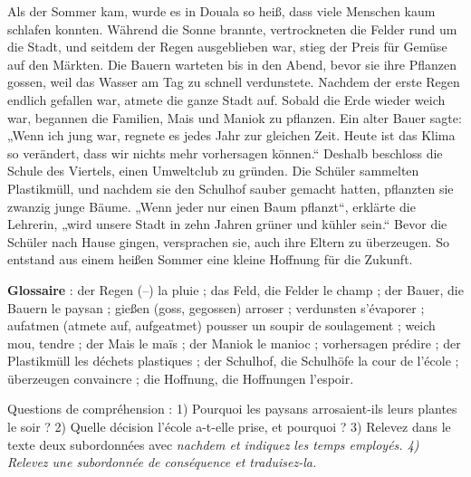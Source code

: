 \documentclass[11pt]{article}
\newcommand{\all}[1]{\ifmmode\text{\textit{#1}}\else\begingroup\selectlanguage{ngerman}\itshape #1\endgroup\fi}
\begin{document}
\begin{textebox}
Als der Sommer kam, wurde es in Douala so heiß, dass viele Menschen kaum schlafen konnten. Während die Sonne brannte, vertrockneten die Felder rund um die Stadt, und seitdem der Regen ausgeblieben war, stieg der Preis für Gemüse auf den Märkten. Die Bauern warteten bis in den Abend, bevor sie ihre Pflanzen gossen, weil das Wasser am Tag zu schnell verdunstete. Nachdem der erste Regen endlich gefallen war, atmete die ganze Stadt auf. Sobald die Erde wieder weich war, begannen die Familien, Mais und Maniok zu pflanzen. Ein alter Bauer sagte: „Wenn ich jung war, regnete es jedes Jahr zur gleichen Zeit. Heute ist das Klima so verändert, dass wir nichts mehr vorhersagen können.“ Deshalb beschloss die Schule des Viertels, einen Umweltclub zu gründen. Die Schüler sammelten Plastikmüll, und nachdem sie den Schulhof sauber gemacht hatten, pflanzten sie zwanzig junge Bäume. „Wenn jeder nur einen Baum pflanzt“, erklärte die Lehrerin, „wird unsere Stadt in zehn Jahren grüner und kühler sein.“ Bevor die Schüler nach Hause gingen, versprachen sie, auch ihre Eltern zu überzeugen. So entstand aus einem heißen Sommer eine kleine Hoffnung für die Zukunft.

\textbf{Glossaire} : der Regen (--) la pluie ; das Feld, die Felder le champ ; der Bauer, die Bauern le paysan ; gießen (goss, gegossen) arroser ; verdunsten s'évaporer ; aufatmen (atmete auf, aufgeatmet) pousser un soupir de soulagement ; weich mou, tendre ; der Mais le maïs ; der Maniok le manioc ; vorhersagen prédire ; der Plastikmüll les déchets plastiques ; der Schulhof, die Schulhöfe la cour de l'école ; überzeugen convaincre ; die Hoffnung, die Hoffnungen l'espoir.
\end{textebox}

Questions de compréhension : 1) Pourquoi les paysans arrosaient-ils leurs plantes le soir ? 2) Quelle décision l'école a-t-elle prise, et pourquoi ? 3) Relevez dans le texte deux subordonnées avec \all{nachdem} et indiquez les temps employés. 4) Relevez une subordonnée de conséquence et traduisez-la.
\end{document}
